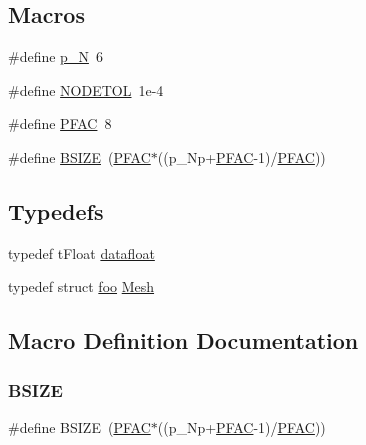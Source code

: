\subsection*{Macros}
\begin{DoxyCompactItemize}
\item 
\#define \hyperlink{a00557_a62cad182019fe2be0f29c294c3412fc4}{p\+\_\+N}~6
\item 
\#define \hyperlink{a00557_afcf239cb9955f8bbee761f1429e28cf9}{N\+O\+D\+E\+T\+OL}~1e-\/4
\item 
\#define \hyperlink{a00557_aa34ba2a0bd4648f24a911d6789081134}{P\+F\+AC}~8
\item 
\#define \hyperlink{a00557_a403cf3149c084cea115b85c90721039a}{B\+S\+I\+ZE}~(\hyperlink{a00557_aa34ba2a0bd4648f24a911d6789081134}{P\+F\+AC}$\ast$((p\+\_\+\+Np+\hyperlink{a00557_aa34ba2a0bd4648f24a911d6789081134}{P\+F\+AC}-\/1)/\hyperlink{a00557_aa34ba2a0bd4648f24a911d6789081134}{P\+F\+AC}))
\end{DoxyCompactItemize}
\subsection*{Typedefs}
\begin{DoxyCompactItemize}
\item 
typedef t\+Float \hyperlink{a00557_aa484d27c864c1a224505d8a302c0a4a4}{datafloat}
\item 
typedef struct \hyperlink{a00758}{foo} \hyperlink{a00557_aeffbe0891ab73a4d8964c9cb7978426e}{Mesh}
\end{DoxyCompactItemize}


\subsection{Macro Definition Documentation}
\mbox{\label{a00557_a403cf3149c084cea115b85c90721039a}} 
\subsubsection{\texorpdfstring{B\+S\+I\+ZE}{BSIZE}}
{\footnotesize\ttfamily \#define B\+S\+I\+ZE~(\hyperlink{a00557_aa34ba2a0bd4648f24a911d6789081134}{P\+F\+AC}$\ast$((p\+\_\+\+Np+\hyperlink{a00557_aa34ba2a0bd4648f24a911d6789081134}{P\+F\+AC}-\/1)/\hyperlink{a00557_aa34ba2a0bd4648f24a911d6789081134}{P\+F\+AC}))}

\mbox{\label{a00557_afcf239cb9955f8bbee761f1429e28cf9}} 
